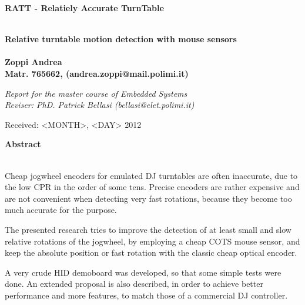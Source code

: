 \documentclass[a4paper,10pt]{article}
\newenvironment*{mytitle}{\begin{LARGE}\bf}{\end{LARGE}\\}%
\newenvironment*{mysubtitle}{\bf}{\\[1.5ex]}%
\newenvironment*{myabstract}{\begin{Large}\bf}{\end{Large}\\[2.5ex]}%
\begin{document}
\newcommand{\TODO}{\textbf{TODO\dots\ }}
\newcommand{\CITEME}{\textbf{[CITEME]}}
\newcommand{\INSFIG}{\textbf{Figure PLACEHOLDER}}


\begin{mytitle}RATT	- Relatiely Accurate TurnTable\end{mytitle}
\begin{mysubtitle}Relative turntable motion detection with mouse sensors\end{mysubtitle}
\\
Zoppi Andrea\\
Matr. 765662, (andrea.zoppi@mail.polimi.it)\\
\begin{flushright}
\emph{Report for the master course of Embedded Systems}\\
\emph{Reviser: PhD. Patrick Bellasi (bellasi@elet.polimi.it)}
\end{flushright}

Received: <MONTH>, <DAY> 2012\\
\hspace{10ex}

\begin{myabstract} Abstract \end{myabstract}
Cheap jogwheel encoders for emulated DJ turntables are often inaccurate, due to
the low CPR in the order of some tens. Precise encoders are rather expensive and
are not convenient when detecting very fast rotations, because they become too
much accurate for the purpose.

The presented research tries to improve the detection of at least small and slow
relative rotations of the jogwheel, by employing a cheap COTS mouse sensor, and
keep the absolute position or fast rotation with the classic cheap optical encoder.

A very crude HID demoboard was developed, so that some simple tests were done.
An extended proposal is also described, in order to achieve better performance
and more features, to match those of a commercial DJ controller.
\end{document}
